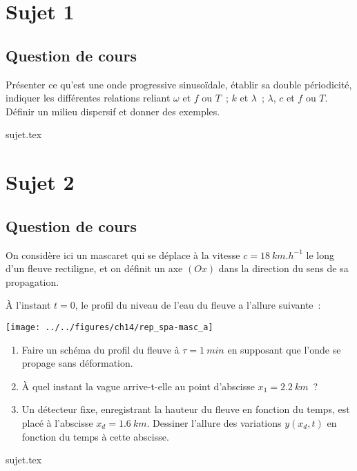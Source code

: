 \documentclass[a4paper, 11pt]{book}
\begin{document}
\chapter{Sujet 1}
\section{Question de cours}

Présenter ce qu'est une onde progressive sinusoïdale, établir sa
        double périodicité, indiquer les différentes relations reliant $\omega$
        et $f$ ou $T$~; $k$ et $\lambda$~; $\lambda$, $c$ et $f$ ou $T$. Définir
        un milieu dispersif et donner des exemples.

\resetQ
{sujet.tex}


\chapter{Sujet 2}
\section{Question de cours}
On considère ici un mascaret qui se déplace à la vitesse $c =
\SI{18}{km.h^{-1}}$ le long d'un fleuve rectiligne, et on définit un axe
$(Ox)$ dans la direction du sens de sa propagation.

À l'instant $t=0$, le profil du niveau de l'eau du fleuve a l'allure
suivante~:
\begin{center}
    \texttt{[image: ../../figures/ch14/rep\_spa-masc\_a]}
\end{center}
\begin{enumerate}[label=\sqenumi]
    \item Faire un schéma du profil du fleuve à $\tau = \SI{1}{min}$ en
        supposant que l'onde se propage sans déformation.
    \item À quel instant la vague arrive-t-elle au point d'abscisse $x_1 =
        \SI{2.2}{km}$~? 
    \item Un détecteur fixe, enregistrant la hauteur du fleuve en fonction
        du temps, est placé à l'abscisse $x_d = \SI{1.6}{km}$. Dessiner
        l'allure des variations $y(x_d,t)$ en fonction du temps à cette
        abscisse.
\end{enumerate}

\resetQ
{sujet.tex}
\end{document}
